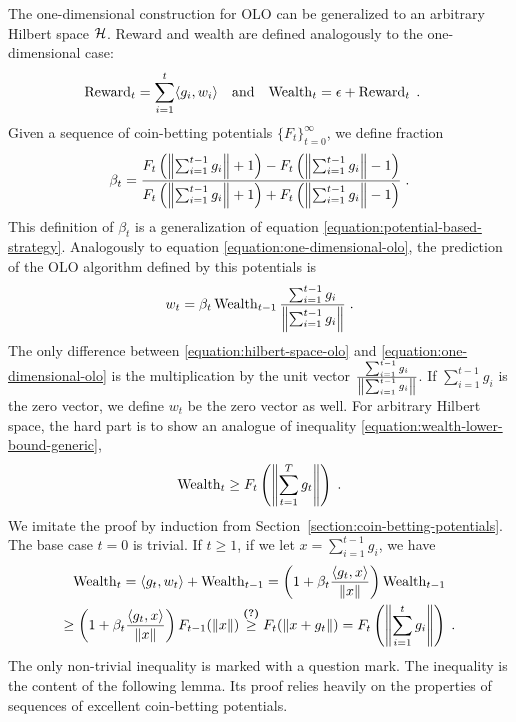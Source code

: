 The one-dimensional construction for OLO can be generalized to an arbitrary
Hilbert space $\mathcal{H}$. Reward and wealth are defined analogously
to the one-dimensional case:
\begin{align*}
\operatorname{Reward}_t &= \sum_{i=1}^t \langle g_i, w_i \rangle &
& \text{and} &
\operatorname{Wealth}_t &= \epsilon + \operatorname{Reward}_t \; .
\end{align*}
Given a sequence of coin-betting potentials $\{F_t\}_{t=0}^\infty$,
we define fraction
\begin{equation}
\label{equation:potential-based-strategy-hilbert-space}
\beta_t = \frac{F_t \left(\left\|{\sum_{i=1}^{t-1} g_i}\right\| + 1\right) - F_t\left(\left\|{\sum_{i=1}^{t-1} g_i}\right\| - 1 \right)}{F_t\left(\left\|{\sum_{i=1}^{t-1} g_i}\right\| + 1 \right) + F_t\left(\left\|{\sum_{i=1}^{t-1} g_i}\right\| - 1 \right)} \; .
\end{equation}
This definition of $\beta_t$ is a generalization of equation
\eqref{equation:potential-based-strategy}.  Analogously to equation
\eqref{equation:one-dimensional-olo}, the prediction of the OLO algorithm
defined by this potentials is
\begin{equation}
\label{equation:hilbert-space-olo}
w_t = \beta_t \operatorname{Wealth}_{t-1} \frac{\sum_{i=1}^{t-1} g_i}{\left\|{\sum_{i=1}^{t-1} g_i}\right\|}  \; .
\end{equation}
The only difference between \eqref{equation:hilbert-space-olo} and
\eqref{equation:one-dimensional-olo} is the multiplication by the unit vector
$\frac{\sum_{i=1}^{t-1} g_i}{\left\|{\sum_{i=1}^{t-1} g_i}\right\|}$. If $\sum_{i=1}^{t-1}
g_i$ is the zero vector, we define $w_t$ be the zero vector as well. For
arbitrary Hilbert space, the hard part is to show an analogue of
inequality \eqref{equation:wealth-lower-bound-generic},
\begin{equation}
\label{equation:wealth-lower-bound-hilbert-space}
\operatorname{Wealth}_t \ge F_t\left(\left\|{\sum_{t=1}^T g_t}\right\| \right) \; .
\end{equation}
We imitate the proof by induction from Section~\ref{section:coin-betting-potentials}.
The base case $t=0$ is trivial. If $t \ge 1$, if we let $x = \sum_{i=1}^{t-1} g_i$,
we have
\begin{multline*}
\operatorname{Wealth}_t
= \langle g_t, w_t \rangle + \operatorname{Wealth}_{t-1}
= \left(1 + \beta_t \frac{\langle g_t, x \rangle}{\|x\|} \right) \operatorname{Wealth}_{t-1} \\
\ge \left(1 + \beta_t \frac{\langle g_t, x \rangle}{\|x\|} \right) F_{t-1}(\left\|{x}\right\|)
\stackrel{\text{\textbf{(?)}}}{\ge} F_t(\left\|{x + g_t}\right\|)
= F_t\left(\left\|{\sum_{i=1}^t g_i}\right\| \right) \; .
\end{multline*}
The only non-trivial inequality is marked with a question mark.
The inequality is the content of the following lemma. Its proof relies heavily
on the properties of sequences of excellent coin-betting potentials.

